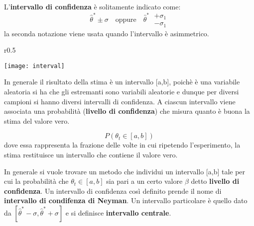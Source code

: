 \documentclass[11pt,a4paper]{book}
\begin{document}
\noindent L'\textbf{intervallo di confidenza} \`{e} solitamente indicato come:
\begin{equation}
	\hat{\theta}^* \pm \sigma \quad \text{oppure} \quad \hat{\theta}^* \; \begin{matrix}
		+\sigma_1 \\ - \sigma_1
	\end{matrix}
\end{equation}
la seconda notazione viene usata quando l'intervallo \`{e} asimmetrico. \newline
\begin{wrapfigure}{r}{0.5 \textwidth}

\vspace{-10pt}
\centering
\texttt{[image: interval]}	

\end{wrapfigure}
In generale il risultato della stima \`{e} un intervallo [a,b], poich\`{e} \`{e} una variabile aleatoria si ha che gli estremanti sono variabili aleatorie e dunque per diversi campioni si hanno diversi intervalli di confidenza. A ciascun intervallo viene associata una probabilit\`{a} (\textbf{livello di confidenza}) che misura quanto \`{e} buona la stima del valore vero.

\begin{equation*}
	P(\theta_t \in [a,b])
\end{equation*}
dove essa rappresenta la frazione delle volte in cui ripetendo l'esperimento, la stima restituisce un intervallo che contiene il valore vero.\newline

In generale si vuole trovare un metodo che individui un intervallo [a,b] tale per cui la probabilit\`{a} che $\theta_t \in [a,b]$ sia pari a un certo valore $\beta$ detto \textbf{livello di confidenza}. Un intervallo di confidenza cos\`{i} definito prende il nome di \textbf{intervallo di condifenza di Neyman}. Un intervallo particolare \`{e} quello dato da $[\hat{\theta}^* - \sigma, \hat{\theta}^* + \sigma]$ e si definisce \textbf{intervallo centrale}.
\end{document}
